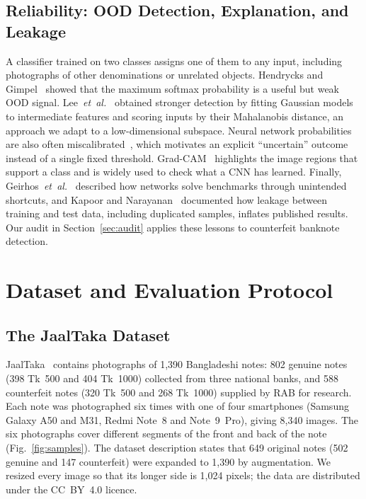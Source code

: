 \documentclass[journal]{IEEEtran}
\begin{document}
\subsection{Reliability: OOD Detection, Explanation, and Leakage}
A classifier trained on two classes assigns one of them to any input, including
photographs of other denominations or unrelated objects. Hendrycks and
Gimpel~\cite{hendrycks2017baseline} showed that the maximum softmax probability is a
useful but weak OOD signal. Lee~\textit{et~al.}~\cite{lee2018mahalanobis} obtained
stronger detection by fitting Gaussian models to intermediate features and scoring
inputs by their Mahalanobis distance, an approach we adapt to a low-dimensional subspace.
Neural network probabilities are also often miscalibrated~\cite{guo2017calibration},
which motivates an explicit ``uncertain'' outcome instead of a single fixed threshold.
Grad-CAM~\cite{selvaraju2017gradcam} highlights the image regions that support a class
and is widely used to check what a CNN has learned. Finally,
Geirhos~\textit{et~al.}~\cite{geirhos2020shortcut} described how networks solve benchmarks
through unintended shortcuts, and Kapoor and Narayanan~\cite{kapoor2023leakage} documented
how leakage between training and test data, including duplicated samples, inflates
published results. Our audit in Section~\ref{sec:audit} applies these lessons to
counterfeit banknote detection.

\section{Dataset and Evaluation Protocol}
\label{sec:data}

\subsection{The JaalTaka Dataset}
JaalTaka~\cite{piyas2025jaaltaka,jaaltaka_data} contains photographs of 1{,}390
Bangladeshi notes: 802 genuine notes (398 Tk~500 and 404 Tk~1000) collected from three
national banks, and 588 counterfeit notes (320 Tk~500 and 268 Tk~1000) supplied by RAB
for research. Each note was photographed six times with one of four smartphones (Samsung
Galaxy A50 and M31, Redmi Note~8 and Note~9~Pro), giving 8{,}340 images. The six photographs
cover different segments of the front and back of the note (Fig.~\ref{fig:samples}). The
dataset description states that 649 original notes (502 genuine and 147 counterfeit) were
expanded to 1{,}390 by augmentation. We resized every image so that its longer side is
1{,}024 pixels; the data are distributed under the CC~BY~4.0 licence.
\end{document}
